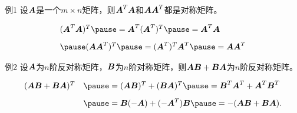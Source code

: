 \begin{frame}
  \begin{footnotesize}
    \begin{block}{例1}
      设$\boldsymbol{A}$是一个$m\times n$矩阵，则$\boldsymbol{A}^T\boldsymbol{A}$和$\boldsymbol{A}\boldsymbol{A}^T$都是对称矩阵。      
    \end{block}
    \pause 
    \proofname
    $$
    \begin{array}{l}
      (\A^T\A)^T \pause = \A^T(\A^T)^T \pause = \A^T \A\\[0.3cm] \pause 
      (\A\A^T)^T \pause = (\A^T)^T\A^T \pause = \A \A^T
    \end{array}
    $$
  \end{footnotesize}
\end{frame}


\begin{frame}
  \begin{footnotesize}
    \begin{block}{例2}
      设$\boldsymbol{A}$为$n$阶反对称矩阵，$\boldsymbol{B}$为$n$阶对称矩阵，则$\boldsymbol{A}\boldsymbol{B}+\boldsymbol{B}\boldsymbol{A}$为$n$阶反对称矩阵。
    \end{block}
    \pause
    \proofname
    $$
    \begin{array}{rl}
      (\A\B+\B\A)^T & \pause =(\A\B)^T+(\B\A)^T \pause = \B^T\A^T+\A^T\B^T \\[0.3cm]
      & \pause
      = \B(-\A) + (-\A^T)\B \pause = - (\A\B+\B\A).      
    \end{array}
    $$
  \end{footnotesize}
\end{frame}
